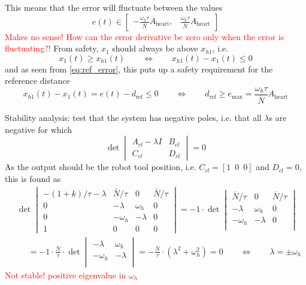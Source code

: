 This means that the error will fluctuate between the values
\begin{equation}
e(t) \in \begin{bmatrix} -\frac{\omega_h \tau}{\bar{N}}A_\text{heart},  & \frac{\omega_h \tau}{\bar{N}}A_\text{heart}  \end{bmatrix}
\end{equation}
\textcolor{red}{Makes no sense! How can the error derivative be zero only when the error is fluctuating?!}
From safety, $x_1$ should always be above $x_{h1}$, i.e.
\begin{equation}
x_1(t)\geq x_{h1}(t) \qquad \Leftrightarrow \qquad x_{h1}(t)-x_1(t)\leq 0
\end{equation}
and as seen from \autoref{eq:ref_error}, this puts up a safety requirement for the reference distance
\begin{equation}
x_{h1}(t)-x_1(t) = e(t)-d_\text{ref}\leq 0 \qquad \Leftrightarrow \qquad d_\text{ref}\geq e_\text{max}=\frac{\omega_h \tau}{\bar{N}}A_\text{heart}
\end{equation}

Stability analysis: test that the system has negative poles, i.e. that all $\lambda$s are negative for which
\begin{equation}
\det\begin{vmatrix}
A_{cl}-\lambda I & B_{cl}\\C_{cl}&D_{cl}
\end{vmatrix}=0
\end{equation}
As the output should be the robot tool position, i.e. $C_{cl}=[1\,\,\,0\,\,\,0]$ and $D_{cl}=0$, this is found as
\begin{align}
&\det\begin{vmatrix}
-(1+k)/\tau-\lambda & \bar{N}/\tau & 0 & \bar{N}/\tau\\
0 & -\lambda  & \omega_h  & 0\\ 
0 & -\omega_h & -\lambda & 0\\
1 & 0 & 0 & 0
\end{vmatrix}
= 
-1 \cdot \det\begin{vmatrix}
\bar{N}/\tau & 0 & \bar{N}/\tau\\
-\lambda & \omega_h  & 0\\ 
-\omega_h & -\lambda & 0\\
\end{vmatrix} \nonumber\\
&\phantom{det}= -1\cdot \frac{\bar{N}}{\tau} \cdot \det 
\begin{vmatrix}
-\lambda & \omega_h\\
-\omega_h &  -\lambda\\
\end{vmatrix}
= -\frac{\bar{N}}{\tau} \cdot (\lambda^2 +\omega_h^2)
= 0 \qquad \Leftrightarrow \qquad \lambda = \pm\omega_h
\end{align}
\textcolor{red}{Not stable! positive eigenvalue in $\omega_h$}

